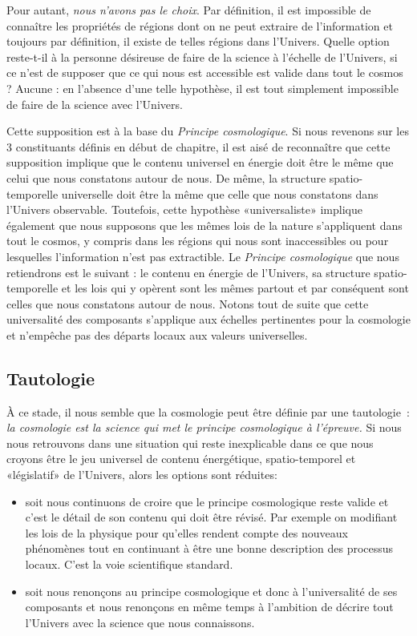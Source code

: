 Pour autant, \textit{nous n'avons pas le choix}. Par définition, il est impossible de connaître les propriétés de régions dont on ne peut extraire de l'information et toujours par définition, il existe de telles régions dans l'Univers. Quelle option reste-t-il à la personne désireuse de faire de la science à l'échelle de l'Univers, si ce n'est de supposer que ce qui nous est accessible est valide dans tout le cosmos ? Aucune : en l'absence d'une telle hypothèse, il est tout simplement impossible de faire de la science avec l'Univers.

Cette supposition est à la base du \textit{Principe cosmologique}. Si nous revenons sur les 3 constituants définis en début de chapitre, il est aisé de reconnaître que cette supposition implique que le contenu universel en énergie doit être le même que celui que nous constatons autour de nous. De même, la structure spatio-temporelle universelle doit être la même que celle que nous constatons dans l'Univers observable. Toutefois, cette hypothèse «universaliste» implique également que nous supposons que les mêmes lois de la nature s'appliquent dans tout le cosmos, y compris dans les régions qui nous sont inaccessibles ou pour lesquelles l'information n'est pas extractible. Le \textit{Principe cosmologique} que nous retiendrons est le suivant : le contenu en énergie de l'Univers, sa structure spatio-temporelle et les lois qui y opèrent sont les mêmes partout et par conséquent sont celles que nous constatons autour de nous. Notons tout de suite que cette universalité des composants s'applique aux échelles pertinentes pour la cosmologie et n'empêche pas des départs locaux aux valeurs universelles.

\subsection{Tautologie}

À ce stade, il nous semble que la cosmologie peut être définie par une tautologie~: \textit{la cosmologie est la science qui met le principe cosmologique à l'épreuve.} Si nous nous retrouvons dans une situation qui reste inexplicable dans ce que nous croyons être le jeu universel de contenu énergétique, spatio-temporel et «législatif» de l'Univers, alors les options sont réduites:
\begin{itemize}
\item soit nous continuons de croire que le principe cosmologique reste valide et c'est le détail de son contenu qui doit être révisé. Par exemple on modifiant les lois de la physique pour qu'elles rendent compte des nouveaux phénomènes tout en continuant à être une bonne description des processus locaux. C'est la voie scientifique standard.
\item soit nous renonçons au principe cosmologique et donc à l'universalité de ses composants et nous renonçons en même temps à l'ambition de décrire tout l'Univers avec la science que nous connaissons.
\end{itemize}

